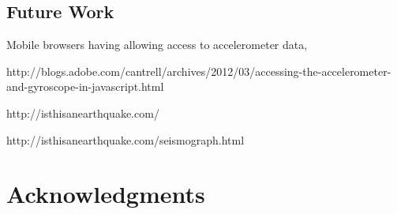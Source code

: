 \documentclass[11pt,conference]{IEEEtran}
\begin{document}
\subsection{Future Work}

Mobile browsers having allowing access to accelerometer data,

http://blogs.adobe.com/cantrell/archives/2012/03/accessing-the-accelerometer-and-gyroscope-in-javascript.html

http://isthisanearthquake.com/

http://isthisanearthquake.com/seismograph.html

\section{Acknowledgments}

%
%



%
%
\end{document}
